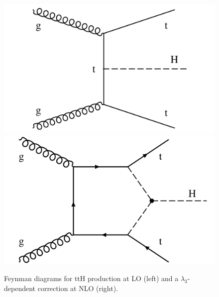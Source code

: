 \begin{figure}
  \centering
  \includegraphics[width=.35\textwidth]{Figures/cms/trilinear/CMS-PAS-HIG-19-005_Figure_001-d.pdf}
  \includegraphics[width=.35\textwidth]{Figures/cms/trilinear/CMS-PAS-FTR-18-020_Figure_001.pdf}
  \caption[Feynam diagram showing a $\lambda_3$-dependent NLO correction to ttH production.]
  {
    Feynman diagrams for ttH production at LO (left) and a $\lambda_3$-dependent correction at NLO (right).
  }
  \label{fig:trilinear_feynman}
\end{figure}

